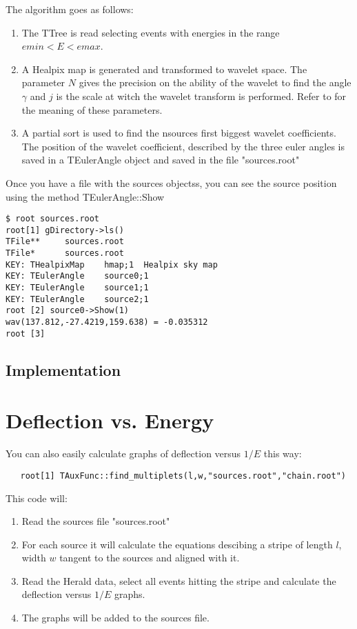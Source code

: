 \documentclass[12pt]{article}
\begin{document}
The algorithm goes as follows:
\begin{enumerate}
\item The TTree is read selecting events with energies in the range $emin < E < emax$.
\item A Healpix map is generated and transformed to wavelet space. The parameter $N$
gives the precision on the ability of the wavelet to find the angle $\gamma$ and $j$
is the scale at witch the wavelet transform is performed. Refer to \cite{gap} for
the meaning of these parameters.
\item A partial sort is used to find the nsources first biggest wavelet coefficients.
The position of the wavelet coefficient, described by the three euler angles is
saved in a TEulerAngle object and saved in the file {\color{brown}"sources.root"}
\end{enumerate}
Once you have a file with the sources objectss, you can see the source position using
the method {\color{brown}TEulerAngle::Show}
{ \color{brown}
\begin{lstlisting}
$ root sources.root
root[1] gDirectory->ls()
TFile**		sources.root	
TFile*		sources.root	
KEY: THealpixMap	hmap;1	Healpix sky map
KEY: TEulerAngle	source0;1	
KEY: TEulerAngle	source1;1	
KEY: TEulerAngle	source2;1	
root [2] source0->Show(1)
wav(137.812,-27.4219,159.638) = -0.035312
root [3] 
\end{lstlisting}
}

\subsection{Implementation}

\section{Deflection vs. Energy} \label{ch::raios-cosmicos}
You can also easily calculate graphs of deflection versus $1/E$ this way:
{ \color{brown}
   \begin{lstlisting}
   root[1] TAuxFunc::find_multiplets(l,w,"sources.root","chain.root")
   \end{lstlisting}
}
This code will:
\begin{enumerate}
\item Read the sources file {\color{brown}"sources.root"}
\item For each source it will calculate the equations descibing a stripe of
length $l$, width $w$ tangent to the sources and aligned with it.
\item Read the Herald data, select all events hitting the stripe and calculate 
the deflection versus $1/E$ graphs.
\item The graphs will be added to the sources file.
\end{enumerate}
\end{document}
